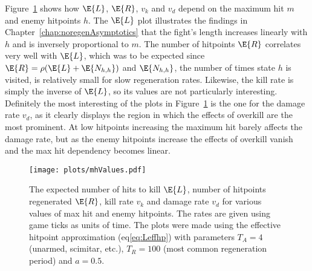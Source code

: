 Figure~\ref{fig:mhValues} shows how $\E{L}$, $\E{R}$, $v_k$ and $v_d$ depend on the maximum hit $m$ and enemy hitpoints $h$. The $\E{L}$ plot illustrates the findings in Chapter~\ref{chap:noregenAsymptotics} that the fight's length increases linearly with $h$ and is inversely proportional to $m$. The number of hitpoints $\E{R}$ correlates very well with $\E{L}$, which was to be expected since $\E{R} = \rho(\E{L} + \E{N_{h,h}})$ and $\E{N_{h,h}}$, the number of times state $h$ is visited, is relatively small for slow regeneration rates. Likewise, the kill rate is simply the inverse of $\E{L}$, so its values are not particularly interesting.
Definitely the most interesting of the plots in Figure~\ref{fig:mhValues} is the one for the damage rate $v_d$, as it clearly displays the region in which the effects of overkill are the most prominent. At low hitpoints increasing the maximum hit barely affects the damage rate, but as the enemy hitpoints increase the effects of overkill vanish and the max hit dependency becomes linear.
\begin{figure}[h]
	\centering
    \texttt{[image: plots/mhValues.pdf]}
	\caption{The expected number of hits to kill $\E{L}$, number of hitpoints regenerated $\E{R}$, kill rate $v_k$ and damage rate $v_d$ for various values of max hit and enemy hitpoints. The rates are given using game ticks as units of time. The plots were made using the effective hitpoint approximation (eq\ref{eq:Leffhp}) with parameters $T_A=4$ (unarmed, scimitar, etc.), $T_R=100$ (most common regeneration period) and $a=0.5$.}\label{fig:mhValues}
\end{figure}

